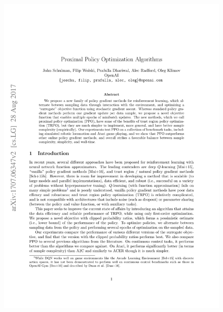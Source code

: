 \documentclass[bachelor]{thesis-uestc}
\begin{document}
	\thesisappendix
	
	
	\thesistranslationoriginal

	\begin{figure}[h]
		\includegraphics[width=13cm]{./pic/ProximalPolicyOptimizationAlgorithms-01.jpg}
	\end{figure}
\end{document}
